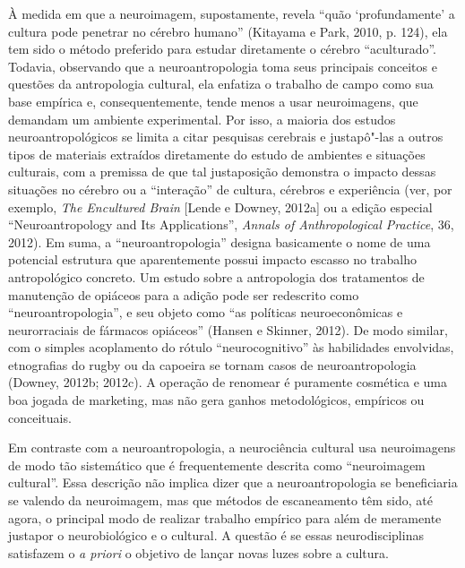 À medida em que a neuroimagem, supostamente, revela ``quão
`profundamente' a cultura pode penetrar no cérebro humano'' (Kitayama
e Park, 2010, p. 124), ela tem sido o método preferido para estudar
diretamente o cérebro ``aculturado''. Todavia, observando que a
neuroantropologia toma seus principais conceitos e questões da
antropologia cultural, ela enfatiza o trabalho de campo como sua base
empírica e, consequentemente, tende menos a usar neuroimagens, que
demandam um ambiente experimental. Por isso, a maioria dos estudos
neuroantropológicos se limita a citar pesquisas cerebrais e justapô"-las
a outros tipos de materiais extraídos diretamente do estudo de ambientes
e situações culturais, com a premissa de que tal justaposição demonstra
o impacto dessas situações no cérebro ou a ``interação'' de cultura,
cérebros e experiência (ver, por exemplo, \emph{The Encultured Brain}
{[}Lende e Downey, 2012a{]} ou a edição especial ``Neuroantropology and
Its Applications'', \emph{Annals of Anthropological Practice}, 36, 2012).
Em suma, a ``neuroantropologia'' designa basicamente o nome de uma
potencial estrutura que aparentemente possui impacto escasso no trabalho
antropológico concreto. Um estudo sobre a antropologia dos tratamentos
de manutenção de opiáceos para a adição pode ser redescrito como
``neuroantropologia'', e seu objeto como ``as políticas neuroeconômicas
e neurorraciais de fármacos opiáceos'' (Hansen e Skinner, 2012). De modo
similar, com o simples acoplamento do rótulo ``neurocognitivo'' às
habilidades envolvidas, etnografias do rugby ou da capoeira se tornam
casos de neuroantropologia (Downey, 2012b; 2012c). A operação de
renomear é puramente cosmética e uma boa jogada de marketing, mas não
gera ganhos metodológicos, empíricos ou conceituais.

Em contraste com a neuroantropologia, a neurociência cultural usa
neuroimagens de modo tão sistemático que é frequentemente descrita como
``neuroimagem cultural''. Essa descrição não implica dizer que a
neuroantropologia se beneficiaria se valendo da neuroimagem, mas que
métodos de escaneamento têm sido, até agora, o principal modo de
realizar trabalho empírico para além de meramente justapor o
neurobiológico e o cultural. A questão é se essas neurodisciplinas
satisfazem o \emph{a priori} o objetivo de lançar novas luzes sobre a
cultura.

